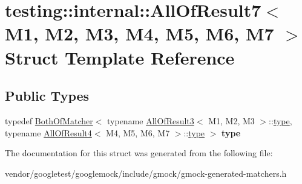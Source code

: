 \hypertarget{structtesting_1_1internal_1_1AllOfResult7}{}\section{testing\+:\+:internal\+:\+:All\+Of\+Result7$<$ M1, M2, M3, M4, M5, M6, M7 $>$ Struct Template Reference}
\label{structtesting_1_1internal_1_1AllOfResult7}
\subsection*{Public Types}
\begin{DoxyCompactItemize}
\item 
typedef \hyperlink{classtesting_1_1internal_1_1BothOfMatcher}{Both\+Of\+Matcher}$<$ typename \hyperlink{structtesting_1_1internal_1_1AllOfResult3}{All\+Of\+Result3}$<$ M1, M2, M3 $>$\+::\hyperlink{classtesting_1_1internal_1_1BothOfMatcher}{type}, typename \hyperlink{structtesting_1_1internal_1_1AllOfResult4}{All\+Of\+Result4}$<$ M4, M5, M6, M7 $>$\+::\hyperlink{classtesting_1_1internal_1_1BothOfMatcher}{type} $>$ {\bfseries type}\hypertarget{structtesting_1_1internal_1_1AllOfResult7_a47ab0d670258434b0e65530591948e8c}{}\label{structtesting_1_1internal_1_1AllOfResult7_a47ab0d670258434b0e65530591948e8c}

\end{DoxyCompactItemize}


The documentation for this struct was generated from the following file\+:\begin{DoxyCompactItemize}
\item 
vendor/googletest/googlemock/include/gmock/gmock-\/generated-\/matchers.\+h\end{DoxyCompactItemize}
